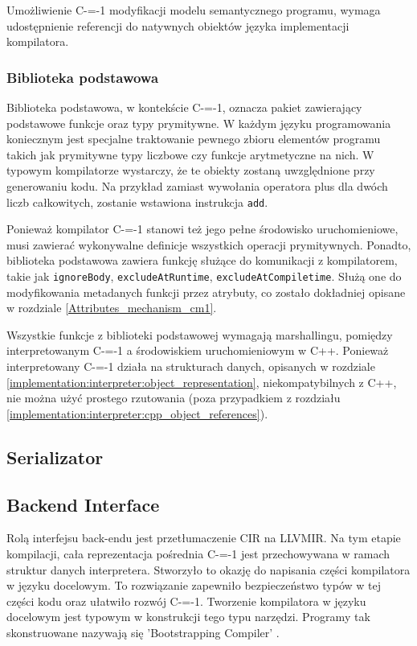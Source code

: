 Umożliwienie C-=-1 modyfikacji modelu semantycznego programu, wymaga udostępnienie referencji do natywnych obiektów języka implementacji kompilatora. %

\subsubsection{Biblioteka podstawowa}
\label{implementation:interpreter:basic_library}

Biblioteka podstawowa, w kontekście C-=-1, oznacza pakiet zawierający podstawowe funkcje oraz typy prymitywne.
W każdym języku programowania koniecznym jest specjalne traktowanie pewnego zbioru elementów programu takich jak prymitywne typy liczbowe czy funkcje arytmetyczne na nich.
W typowym kompilatorze wystarczy, że te obiekty zostaną uwzględnione przy generowaniu kodu.
Na przykład zamiast wywołania operatora plus dla dwóch liczb całkowitych, zostanie wstawiona instrukcja \lstinline{add}.

Ponieważ kompilator C-=-1 stanowi też jego pełne środowisko uruchomieniowe, musi zawierać wykonywalne definicje wszystkich operacji prymitywnych.
Ponadto, biblioteka podstawowa zawiera funkcję służące do komunikacji z kompilatorem, takie jak \lstinline{ignoreBody}, \lstinline{excludeAtRuntime}, \lstinline{excludeAtCompiletime}.
Służą one do modyfikowania metadanych funkcji przez atrybuty, co zostało dokładniej opisane w rozdziale \ref{Attributes_mechanism_cm1}.

Wszystkie funkcje z biblioteki podstawowej wymagają marshallingu, pomiędzy interpretowanym C-=-1 a środowiskiem uruchomieniowym w C++.
Ponieważ interpretowany C-=-1 działa na strukturach danych, opisanych w rozdziale \ref{implementation:interpreter:object_representation}, niekompatybilnych z C++, nie można użyć prostego rzutowania (poza przypadkiem z rozdziału \ref{implementation:interpreter:cpp_object_references}).

\subsection{Serializator}
\label{serializer}

\subsection{Backend Interface}
\label{Backend_Interface}
Rolą interfejsu back-endu jest przetłumaczenie CIR na LLVMIR.
Na tym etapie kompilacji, cała reprezentacja pośrednia C-=-1 jest przechowywana w ramach struktur danych interpretera.
Stworzyło to okazję do napisania części kompilatora w języku docelowym.
To rozwiązanie zapewniło bezpieczeństwo typów w tej części kodu oraz ułatwiło rozwój C-=-1.
Tworzenie kompilatora w języku docelowym jest typowym w konstrukcji tego typu narzędzi.
Programy tak skonstruowane nazywają się 'Bootstrapping Compiler' \cite{puntambekar:compiler_design}. 

